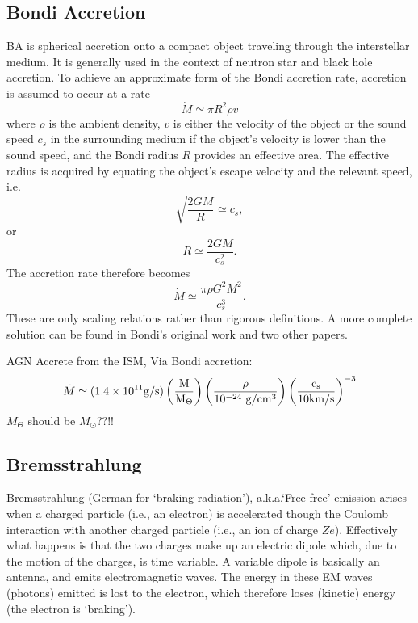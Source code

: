 \documentclass[11pt]{article}
\begin{document}
\subsection*{Bondi Accretion}
BA is spherical accretion onto a compact object traveling through
the interstellar medium. It is generally used in the context of
neutron star and black hole accretion. To achieve an approximate form
of the Bondi accretion rate, accretion is assumed to occur at a rate
\begin{equation}
  \dot {M}\simeq \pi R^{2}\rho v
\end{equation}
where $\rho$ is the ambient density, $v$ is either the velocity of the
object or the sound speed $ c_{s}$ in the surrounding medium if the
object's velocity is lower than the sound speed, and the Bondi radius
$R$ provides an effective area. The effective radius is acquired by
equating the object's escape velocity and the relevant speed, i.e.
\begin{equation}
  \sqrt{\frac{2 G M}{R}} \simeq c_s, 
\end{equation}
or
\begin{equation}
  R\simeq\frac{2 G M}{c_s^2}.
\end{equation}
The accretion rate therefore becomes
\begin{equation}
\dot {M} \simeq \frac{\pi \rho G^{2}M^{2}}{c_{s}^{3}} .
\end{equation}
These are only scaling relations rather than rigorous definitions. A
more complete solution can be found in Bondi's original work and two
other papers.

AGN Accrete from the ISM, Via Bondi accretion:
    \begin{equation}
      \dot{M} \simeq (1.4\times10^{11} \rm{g/s}) \left( \frac{M}{M_{\Theta}} \right) \left( \frac{\rho}{10^{-24}\ \rm{g / cm^{3}}} \right)  \left( \frac{c_s}{10 \rm{km/s}} \right)^{-3}
    \end{equation}
 $M_{\Theta}$ should be $M_{\odot}$??!!

\subsection*{Bremsstrahlung}
Bremsstrahlung (German for ‘braking radiation’), a.k.a.`Free-free' emission arises when a charged particle (i.e., an electron) is accelerated though the Coulomb interaction with another charged particle (i.e., an ion of charge $Ze$). Effectively what happens is that the two charges make up an electric dipole which, due to the motion of the charges, is time variable. A variable dipole is basically an antenna, and emits electromagnetic waves. The energy in these EM waves (photons) emitted is lost to the electron, which therefore loses (kinetic) energy (the electron is ‘braking’).
\end{document}
